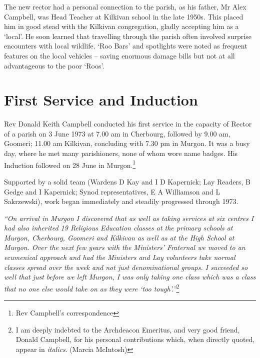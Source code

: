 The new rector had a personal connection to the parish, as his father, Mr Alex Campbell, was Head Teacher at Kilkivan school in the late 1950s. This placed him in good stead with the Kilkivan congregation, gladly accepting him as a `local'. He soon learned that travelling through the parish often involved surprise encounters with local wildlife. `Roo Bars' and spotlights were noted as frequent features on the local vehicles -- saving enormous damage bills but not at all advantageous to the poor `Roos'.



\section{First Service and Induction}



Rev Donald Keith Campbell conducted his first service in the capacity of Rector of a parish on 3 June 1973 at 7.00 am in Cherbourg, followed by 9.00 am, Goomeri; 11.00 am Kilkivan, concluding with 7.30 pm in Murgon. It was a busy day, where he met many parishioners, none of whom wore name badges. His Induction followed on 28 June in Murgon.\footnote{Rev Campbell's correspondence}


Supported by a solid team (Wardens D Kay and I D Kapernick; Lay Readers, B Gedge and I Kapernick; Synod representatives, E A Williamson and L Sakrzewski), work began immediately and steadily progressed through 1973.



\emph{``On arrival in Murgon I discovered that as well as taking services at six centres I had also inherited 19 Religious Education classes at the primary schools at Murgon, Cherbourg, Goomeri and Kilkivan as well as at the High School at Murgon. Over the next few years with the Ministers' Fraternal we moved to an ecumenical approach and had the Ministers and Lay volunteers take normal classes spread over the week and not just denominational groups. I succeeded so well that just before we left Murgon, I was only taking one class which was a class that no one else would take on as they were `too tough'.''}\footnote{I am deeply indebted to the Archdeacon Emeritus, and very good friend, Donald Campbell, for his personal contributions which, when directly quoted, appear in \emph{italics}. (Marcia McIntosh)}


